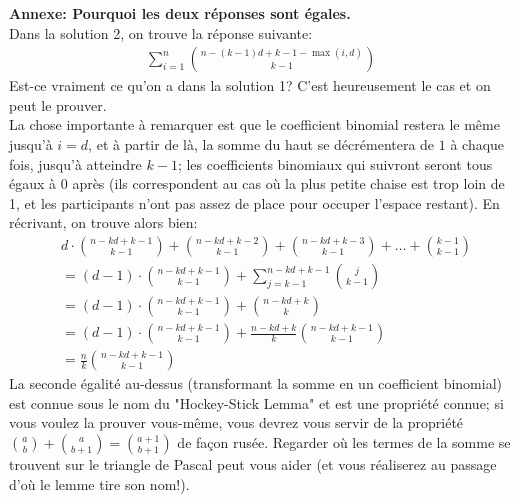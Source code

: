 {\textbf{Annexe: Pourquoi les deux réponses sont égales.}\\
Dans la solution 2, on trouve la réponse suivante:
\begin{align*}
    \sum_{i=1}^{n} \binom{n-(k-1)d+k-1-\max(i,d)}{k-1} 
\end{align*}
Est-ce vraiment ce qu'on a dans la solution 1? C'est heureusement le cas et on peut le prouver.\\ La chose importante à remarquer est que le coefficient binomial restera le même jusqu'à $i=d$, et à partir de là, la somme du haut se décrémentera de $1$ à chaque fois, jusqu'à atteindre $k-1$; les coefficients binomiaux qui suivront seront tous égaux à $0$ après (ils correspondent au cas où la plus petite chaise est trop loin de 1, et les participants n'ont pas assez de place pour occuper l'espace restant). En récrivant, on trouve alors bien:
\begin{align*}
    &d \cdot \binom{n-kd+k-1}{k-1} + \binom{n-kd+k-2}{k-1} + \binom{n-kd+k-3}{k-1} + \dots + \binom{k-1}{k-1}\\
    &= (d-1) \cdot \binom{n-kd+k-1}{k-1} + \sum_{j = k-1}^{n-kd+k-1} \binom{j}{k-1}\\
    &= (d-1) \cdot \binom{n-kd+k-1}{k-1} + \binom{n-kd+k}{k}\\
    &= (d-1) \cdot \binom{n-kd+k-1}{k-1} + \frac{n-kd+k}{k}\binom{n-kd+k-1}{k-1}\\
    &= \frac{n}{k} \binom{n-kd+k-1}{k-1}
\end{align*}
La seconde égalité au-dessus (transformant la somme en un coefficient binomial) est connue sous le nom du "Hockey-Stick Lemma" et est une propriété connue; si vous voulez la prouver vous-même, vous devrez vous servir de la propriété $\binom{a}{b} + \binom{a}{b+1} = \binom{a+1}{b+1}$ de façon rusée. Regarder où les termes de la somme se trouvent sur le triangle de Pascal peut vous aider (et vous réaliserez au passage d'où le lemme tire son nom!).
}
